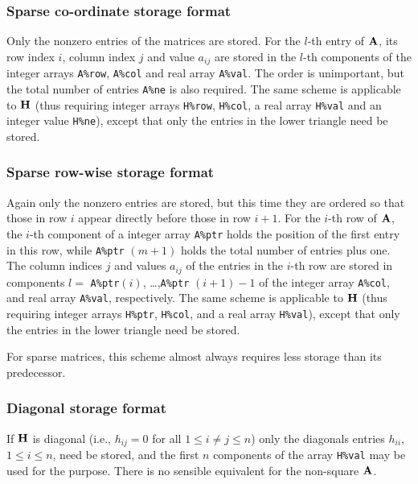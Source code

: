 \documentclass{galahad}
\begin{document}
\subsubsection{Sparse co-ordinate storage format}\label{coordinate}
Only the nonzero entries of the matrices are stored. For the 
$l$-th entry of ${\mathbf{A}}$, its row index $i$, column index $j$ 
and value $a_{ij}$
are stored in the $l$-th components of the integer arrays {\tt A\%row}, 
{\tt A\%col} and real array {\tt A\%val}. 
The order is unimportant, but the total
number of entries {\tt A\%ne} is also required. 
The same scheme is applicable to
${\mathbf{H}}$ (thus requiring integer arrays {\tt H\%row}, {\tt H\%col}, a real array 
{\tt H\%val} and an integer value {\tt H\%ne}),
except that only the entries in the lower triangle need be stored.

\subsubsection{Sparse row-wise storage format}\label{rowwise}
Again only the nonzero entries are stored, but this time
they are ordered so that those in row $i$ appear directly before those
in row $i+1$. For the $i$-th row of ${\mathbf{A}}$, the $i$-th component of a 
integer array {\tt A\%ptr} holds the position of the first entry in this row,
while {\tt A\%ptr} $(m+1)$ holds the total number of entries plus one.
The column indices $j$ and values $a_{ij}$ of the entries in the $i$-th row 
are stored in components 
$l =$ {\tt A\%ptr}$(i)$, \ldots ,{\tt A\%ptr} $(i+1)-1$ of the 
integer array {\tt A\%col}, and real array {\tt A\%val}, respectively. 
The same scheme is applicable to
${\mathbf{H}}$ (thus requiring integer arrays {\tt H\%ptr}, {\tt H\%col}, and 
a real array {\tt H\%val}),
except that only the entries in the lower triangle need be stored.

For sparse matrices, this scheme almost always requires less storage than 
its predecessor.

\subsubsection{Diagonal storage format}\label{diagonal}
If ${\mathbf{H}}$ is diagonal (i.e., $h_{ij} = 0$ for all $1 \leq i \neq j \leq n$)
only the diagonals entries $h_{ii}$, $1 \leq i \leq n$,  need be stored,
and the first $n$ components of the array {\tt H\%val} may be used for 
the purpose. There is no sensible equivalent for the non-square ${\mathbf{A}}$.

\end{document}
